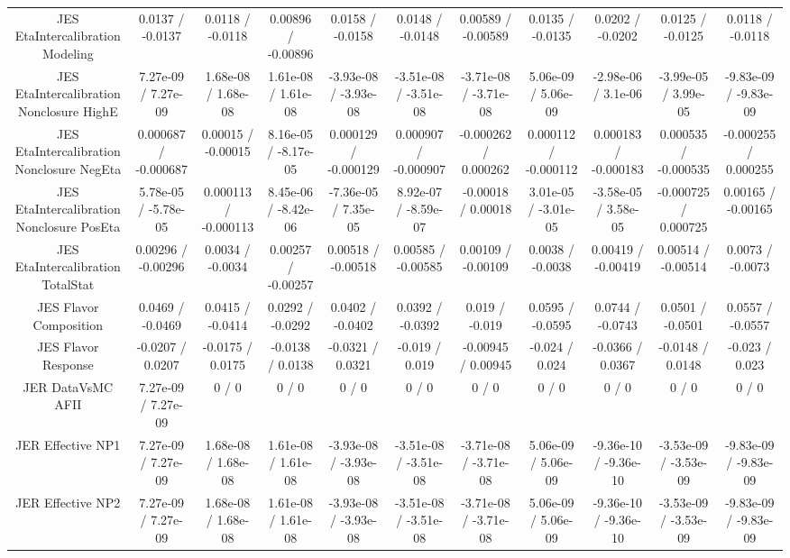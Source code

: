 \begin{table}[htbp]
\begin{center}
\begin{tabular}{|c|c|c|c|c|c|c|c|c|c|c|}
  JES EtaIntercalibration Modeling & 0.0137 / -0.0137 & 0.0118 / -0.0118 & 0.00896 / -0.00896 & 0.0158 / -0.0158 & 0.0148 / -0.0148 & 0.00589 / -0.00589 & 0.0135 / -0.0135 & 0.0202 / -0.0202 & 0.0125 / -0.0125 & 0.0118 / -0.0118 \\ 
  JES EtaIntercalibration Nonclosure HighE & 7.27e-09 / 7.27e-09 & 1.68e-08 / 1.68e-08 & 1.61e-08 / 1.61e-08 & -3.93e-08 / -3.93e-08 & -3.51e-08 / -3.51e-08 & -3.71e-08 / -3.71e-08 & 5.06e-09 / 5.06e-09 & -2.98e-06 / 3.1e-06 & -3.99e-05 / 3.99e-05 & -9.83e-09 / -9.83e-09 \\ 
  JES EtaIntercalibration Nonclosure NegEta & 0.000687 / -0.000687 & 0.00015 / -0.00015 & 8.16e-05 / -8.17e-05 & 0.000129 / -0.000129 & 0.000907 / -0.000907 & -0.000262 / 0.000262 & 0.000112 / -0.000112 & 0.000183 / -0.000183 & 0.000535 / -0.000535 & -0.000255 / 0.000255 \\ 
  JES EtaIntercalibration Nonclosure PosEta & 5.78e-05 / -5.78e-05 & 0.000113 / -0.000113 & 8.45e-06 / -8.42e-06 & -7.36e-05 / 7.35e-05 & 8.92e-07 / -8.59e-07 & -0.00018 / 0.00018 & 3.01e-05 / -3.01e-05 & -3.58e-05 / 3.58e-05 & -0.000725 / 0.000725 & 0.00165 / -0.00165 \\ 
  JES EtaIntercalibration TotalStat & 0.00296 / -0.00296 & 0.0034 / -0.0034 & 0.00257 / -0.00257 & 0.00518 / -0.00518 & 0.00585 / -0.00585 & 0.00109 / -0.00109 & 0.0038 / -0.0038 & 0.00419 / -0.00419 & 0.00514 / -0.00514 & 0.0073 / -0.0073 \\ 
  JES Flavor Composition & 0.0469 / -0.0469 & 0.0415 / -0.0414 & 0.0292 / -0.0292 & 0.0402 / -0.0402 & 0.0392 / -0.0392 & 0.019 / -0.019 & 0.0595 / -0.0595 & 0.0744 / -0.0743 & 0.0501 / -0.0501 & 0.0557 / -0.0557 \\ 
  JES Flavor Response & -0.0207 / 0.0207 & -0.0175 / 0.0175 & -0.0138 / 0.0138 & -0.0321 / 0.0321 & -0.019 / 0.019 & -0.00945 / 0.00945 & -0.024 / 0.024 & -0.0366 / 0.0367 & -0.0148 / 0.0148 & -0.023 / 0.023 \\ 
  JER DataVsMC AFII & 7.27e-09 / 7.27e-09 & 0 / 0 & 0 / 0 & 0 / 0 & 0 / 0 & 0 / 0 & 0 / 0 & 0 / 0 & 0 / 0 & 0 / 0 \\ 
  JER Effective NP1 & 7.27e-09 / 7.27e-09 & 1.68e-08 / 1.68e-08 & 1.61e-08 / 1.61e-08 & -3.93e-08 / -3.93e-08 & -3.51e-08 / -3.51e-08 & -3.71e-08 / -3.71e-08 & 5.06e-09 / 5.06e-09 & -9.36e-10 / -9.36e-10 & -3.53e-09 / -3.53e-09 & -9.83e-09 / -9.83e-09 \\ 
  JER Effective NP2 & 7.27e-09 / 7.27e-09 & 1.68e-08 / 1.68e-08 & 1.61e-08 / 1.61e-08 & -3.93e-08 / -3.93e-08 & -3.51e-08 / -3.51e-08 & -3.71e-08 / -3.71e-08 & 5.06e-09 / 5.06e-09 & -9.36e-10 / -9.36e-10 & -3.53e-09 / -3.53e-09 & -9.83e-09 / -9.83e-09 \\ 

\end{tabular}
\end{center}
\end{table}

